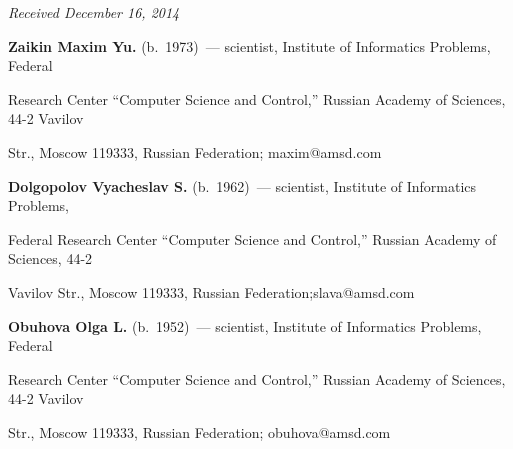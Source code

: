 {{{} }








\vspace*{-6pt}





\hfill{\small\textit{Received December 16, 2014}}





  \Contr





\noindent


\textbf{Zaikin Maxim Yu.} (b.\ 1973)~--- scientist, Institute of Informatics Problems, Federal


Research Center ``Computer Science and Control,'' Russian Academy of Sciences, 44-2 Vavilov


Str., Moscow 119333, Russian Federation; maxim@amsd.com





\vspace{3pt}





\noindent


\textbf{Dolgopolov Vyacheslav S.} (b.\ 1962)~--- scientist, Institute of Informatics Problems,


Federal Research Center ``Computer Science and Control,'' Russian Academy of Sciences, 44-2


Vavilov Str., Moscow 119333, Russian Federation;\linebreak slava@amsd.com





\vspace*{3pt}





\noindent


\textbf{Obuhova Olga L.} (b.\ 1952)~--- scientist, Institute of Informatics Problems, Federal


Research Center ``Computer Science and Control,'' Russian Academy of Sciences, 44-2 Vavilov


Str., Moscow 119333, Russian Federation; obuhova@amsd.com





\vspace*{3pt}





}
